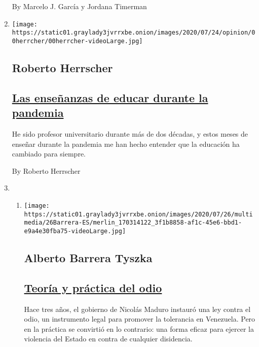 \begin{enumerate}
  By Marcelo J. García y Jordana Timerman
\item
  \texttt{[image: https://static01.graylady3jvrrxbe.onion/images/2020/07/24/opinion/00herrcher/00herrcher-videoLarge.jpg]}

  \hypertarget{roberto-herrscher}{%
  \subsection{Roberto Herrscher}\label{roberto-herrscher}}

  \hypertarget{las-enseuxf1anzas-de-educar-durante-la-pandemia}{%
  \subsection{\texorpdfstring{\href{/es/2020/07/27/espanol/opinion/clases-universidad-coronavirus.html}{Las
  enseñanzas de educar durante la
  pandemia}}{Las enseñanzas de educar durante la pandemia}}\label{las-enseuxf1anzas-de-educar-durante-la-pandemia}}

  He sido profesor universitario durante más de dos décadas, y estos
  meses de enseñar durante la pandemia me han hecho entender que la
  educación ha cambiado para siempre.

  By Roberto Herrscher
\item
  \begin{enumerate}
  \def\labelenumii{\arabic{enumii}.}
  \item
    \texttt{[image: https://static01.graylady3jvrrxbe.onion/images/2020/07/26/multimedia/26Barrera-ES/merlin\_170314122\_3f1b8858-af1c-45e6-bbd1-e9a4e30fba75-videoLarge.jpg]}

    \hypertarget{alberto-barrera-tyszka}{%
    \subsection{Alberto Barrera Tyszka}\label{alberto-barrera-tyszka}}

    \hypertarget{teoruxeda-y-pruxe1ctica-del-odio}{%
    \subsection{\texorpdfstring{\href{/es/2020/07/26/espanol/opinion/nicmer-evans-venezuela.html}{Teoría
    y práctica del
    odio}}{Teoría y práctica del odio}}\label{teoruxeda-y-pruxe1ctica-del-odio}}

    Hace tres años, el gobierno de Nicolás Maduro instauró una ley
    contra el odio, un instrumento legal para promover la tolerancia en
    Venezuela. Pero en la práctica se convirtió en lo contrario: una
    forma eficaz para ejercer la violencia del Estado en contra de
    cualquier disidencia.


\end{enumerate}
\end{enumerate}
